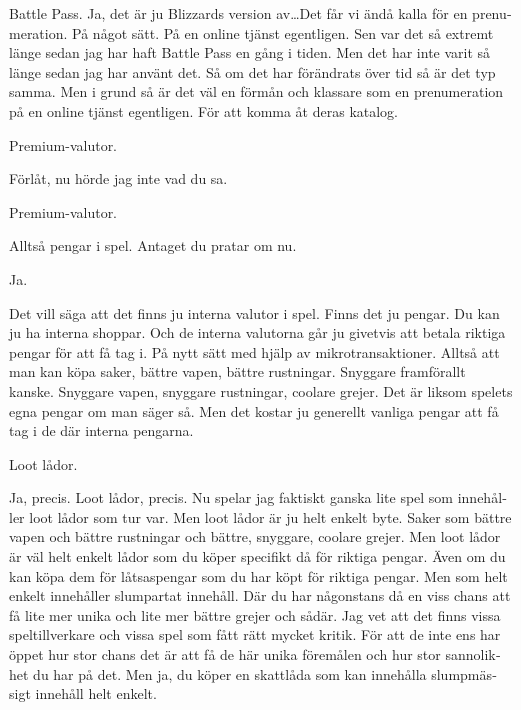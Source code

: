 \documentclass[11p]{article}
\begin{document}
\begin{otherlanguage}{swedish}
        Battle Pass. Ja, det är ju Blizzards version av\dots Det får vi ändå kalla för en prenumeration. På något sätt.
        På en online tjänst egentligen. Sen var det så extremt länge sedan jag har haft Battle Pass en gång i tiden. Men det har inte varit så länge sedan jag har använt det.
        Så om det har förändrats över tid så är det typ samma. Men i grund så är det väl en förmån och klassare som en prenumeration på en online tjänst egentligen. För att komma åt deras katalog.


        \setlength{\leftskip}{0cm}
        Premium-valutor.

        \setlength{\leftskip}{1cm}
        Förlåt, nu hörde jag inte vad du sa.


        \setlength{\leftskip}{0cm}
        Premium-valutor.

        \setlength{\leftskip}{1cm}

        Alltså pengar i spel. Antaget du pratar om nu.


        \setlength{\leftskip}{0cm}
        Ja.

        \setlength{\leftskip}{1cm}

        Det vill säga att det finns ju interna valutor i spel. Finns det ju pengar. Du kan ju ha interna shoppar. Och de interna valutorna går ju givetvis att betala riktiga pengar för att få tag i.
        På nytt sätt med hjälp av mikrotransaktioner. Alltså att man kan köpa saker, bättre vapen, bättre rustningar. Snyggare framförallt kanske. Snyggare vapen, snyggare rustningar, coolare grejer.
        Det är liksom spelets egna pengar om man säger så. Men det kostar ju generellt vanliga pengar att få tag i de där interna pengarna.


        \setlength{\leftskip}{0cm}
        Loot lådor.


        \setlength{\leftskip}{1cm}
        Ja, precis. Loot lådor, precis. Nu spelar jag faktiskt ganska lite spel som innehåller loot lådor som tur var. Men loot lådor är ju helt enkelt byte.
        Saker som bättre vapen och bättre rustningar och bättre, snyggare, coolare grejer. Men loot lådor är väl helt enkelt lådor som du köper specifikt då för riktiga pengar.
        Även om du kan köpa dem för låtsaspengar som du har köpt för riktiga pengar. Men som helt enkelt innehåller slumpartat innehåll. Där du har någonstans då en viss chans att få lite mer unika och lite mer bättre grejer och sådär. Jag vet att det finns vissa speltillverkare och vissa spel som fått rätt mycket kritik. För att de inte ens har öppet hur stor chans det är att få de här unika föremålen och hur stor sannolikhet du har på det. Men ja, du köper en skattlåda som kan innehålla slumpmässigt innehåll helt enkelt.




\end{otherlanguage}
\end{document}
